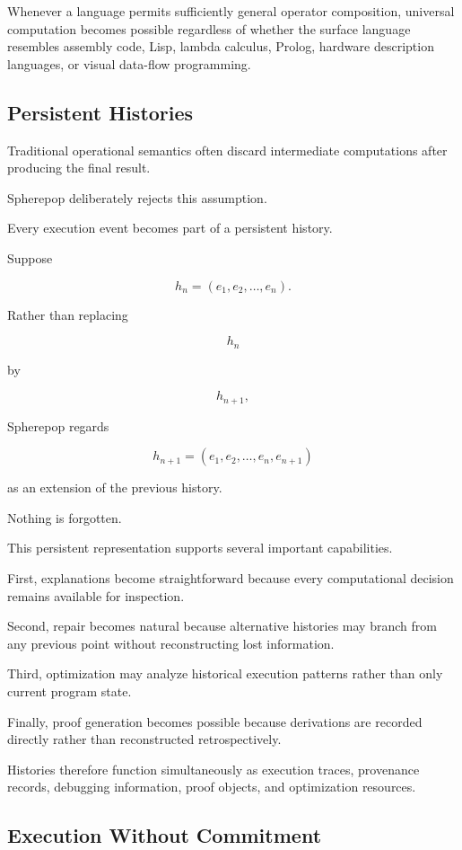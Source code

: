\documentclass[12pt,oneside]{article}
\begin{document}
Whenever a language permits sufficiently general operator composition, universal computation becomes possible regardless of whether the surface language resembles assembly code, Lisp, lambda calculus, Prolog, hardware description languages, or visual data-flow programming.

\subsection{Persistent Histories}

Traditional operational semantics often discard intermediate computations after producing the final result.

Spherepop deliberately rejects this assumption.

Every execution event becomes part of a persistent history.

Suppose

\[
h_n
=
(e_1,e_2,\ldots,e_n).
\]

Rather than replacing

\[
h_n
\]

by

\[
h_{n+1},
\]

Spherepop regards

\[
h_{n+1}
=
(e_1,e_2,\ldots,e_n,e_{n+1})
\]

as an extension of the previous history.

Nothing is forgotten.

This persistent representation supports several important capabilities.

First, explanations become straightforward because every computational decision remains available for inspection.

Second, repair becomes natural because alternative histories may branch from any previous point without reconstructing lost information.

Third, optimization may analyze historical execution patterns rather than only current program state.

Finally, proof generation becomes possible because derivations are recorded directly rather than reconstructed retrospectively.

Histories therefore function simultaneously as execution traces, provenance records, debugging information, proof objects, and optimization resources.

\subsection{Execution Without Commitment}
\end{document}
